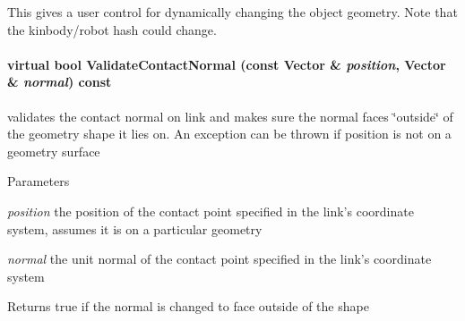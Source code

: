 This gives a user control for dynamically changing the object geometry. Note that the kinbody/robot hash could change. \hypertarget{classOpenRAVE_1_1KinBody_1_1Link_a80c6877ca0a3b0f5104b00ccfbc7b591}{
\paragraph[{ValidateContactNormal}]{\setlength{\rightskip}{0pt plus 5cm}virtual bool ValidateContactNormal (const Vector \& {\em position}, \/  Vector \& {\em normal}) const}\hfill}
\label{classOpenRAVE_1_1KinBody_1_1Link_a80c6877ca0a3b0f5104b00ccfbc7b591}
validates the contact normal on link and makes sure the normal faces \char`\"{}outside\char`\"{} of the geometry shape it lies on. An exception can be thrown if position is not on a geometry surface 
\begin{DoxyParams}{Parameters}
\item[{\em position}]the position of the contact point specified in the link's coordinate system, assumes it is on a particular geometry \item[{\em normal}]the unit normal of the contact point specified in the link's coordinate system \end{DoxyParams}
\begin{DoxyReturn}{Returns}
true if the normal is changed to face outside of the shape 
\end{DoxyReturn}



